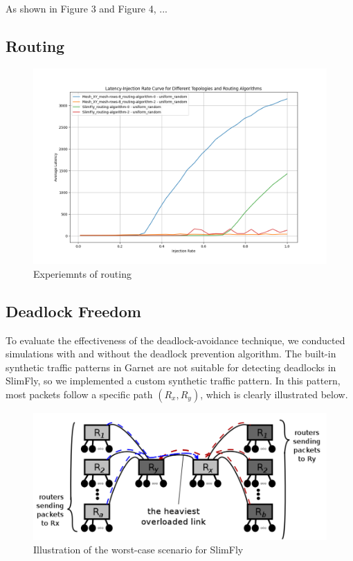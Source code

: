 \documentclass[utf8]{article}
\begin{document}
As shown in Figure 3 and Figure 4, ...

\subsection{Routing}

\begin{figure}[H]
    \centering
    \includegraphics[width=0.85\linewidth]{routing.png}
    \caption{Experiemnts of routing}
\end{figure}

\subsection{Deadlock Freedom}

To evaluate the effectiveness of the deadlock-avoidance technique, we conducted simulations with and without the deadlock prevention algorithm. The built-in synthetic traffic patterns in Garnet are not suitable for detecting deadlocks in SlimFly, so we implemented a custom synthetic traffic pattern. In this pattern, most packets follow a specific path \((R_x, R_y)\), which is clearly illustrated below.

\begin{figure}[H]
    \centering
    \includegraphics[width=0.6\linewidth]{WorstCase.png}
    \caption{Illustration of the worst-case scenario for SlimFly}
\end{figure}
\end{document}
